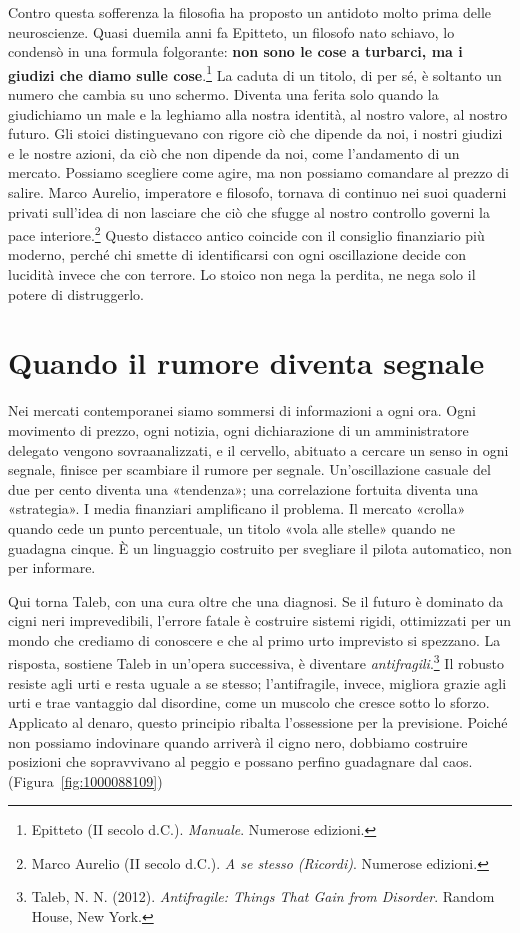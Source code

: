 Contro questa sofferenza la filosofia ha proposto un antidoto molto prima delle neuroscienze. Quasi duemila anni fa Epitteto, un filosofo nato schiavo, lo condens\`{o} in una formula folgorante: \textbf{non sono le cose a turbarci, ma i giudizi che diamo sulle cose}.\footnote{Epitteto (II secolo d.C.). \textit{Manuale}. Numerose edizioni.} La caduta di un titolo, di per s\'{e}, \`{e} soltanto un numero che cambia su uno schermo. Diventa una ferita solo quando la giudichiamo un male e la leghiamo alla nostra identit\`{a}, al nostro valore, al nostro futuro. Gli stoici distinguevano con rigore ci\`{o} che dipende da noi, i nostri giudizi e le nostre azioni, da ci\`{o} che non dipende da noi, come l'andamento di un mercato. Possiamo scegliere come agire, ma non possiamo comandare al prezzo di salire. Marco Aurelio, imperatore e filosofo, tornava di continuo nei suoi quaderni privati sull'idea di non lasciare che ci\`{o} che sfugge al nostro controllo governi la pace interiore.\footnote{Marco Aurelio (II secolo d.C.). \textit{A se stesso (Ricordi)}. Numerose edizioni.} Questo distacco antico coincide con il consiglio finanziario pi\`{u} moderno, perch\'{e} chi smette di identificarsi con ogni oscillazione decide con lucidit\`{a} invece che con terrore. Lo stoico non nega la perdita, ne nega solo il potere di distruggerlo.

\section{Quando il rumore diventa segnale}

Nei mercati contemporanei siamo sommersi di informazioni a ogni ora. Ogni movimento di prezzo, ogni notizia, ogni dichiarazione di un amministratore delegato vengono sovraanalizzati, e il cervello, abituato a cercare un senso in ogni segnale, finisce per scambiare il rumore per segnale. Un'oscillazione casuale del due per cento diventa una «tendenza»; una correlazione fortuita diventa una «strategia». I media finanziari amplificano il problema. Il mercato «crolla» quando cede un punto percentuale, un titolo «vola alle stelle» quando ne guadagna cinque. \`{E} un linguaggio costruito per svegliare il pilota automatico, non per informare.

Qui torna Taleb, con una cura oltre che una diagnosi. Se il futuro \`{e} dominato da cigni neri imprevedibili, l'errore fatale \`{e} costruire sistemi rigidi, ottimizzati per un mondo che crediamo di conoscere e che al primo urto imprevisto si spezzano. La risposta, sostiene Taleb in un'opera successiva, \`{e} diventare \textit{antifragili}.\footnote{Taleb, N. N. (2012). \textit{Antifragile: Things That Gain from Disorder}. Random House, New York.} Il robusto resiste agli urti e resta uguale a se stesso; l'antifragile, invece, migliora grazie agli urti e trae vantaggio dal disordine, come un muscolo che cresce sotto lo sforzo. Applicato al denaro, questo principio ribalta l'ossessione per la previsione. Poich\'{e} non possiamo indovinare quando arriver\`{a} il cigno nero, dobbiamo costruire posizioni che sopravvivano al peggio e possano perfino guadagnare dal caos. (Figura~\ref{fig:1000088109})

